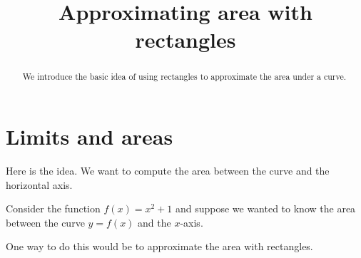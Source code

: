 \documentclass{ximera}
\title[Dig-In:]{Approximating area with rectangles}
\begin{document}
\begin{abstract}
  We introduce the basic idea of using rectangles to approximate the
  area under a curve.
\end{abstract}
\maketitle

\section{Limits and areas}

Here is the idea. We want to compute the area between the curve and
the horizontal axis.

Consider the function $f(x) = x^2 +1$ and suppose we wanted to know
the area between the curve $y=f(x)$ and the $x$-axis.
\begin{image}
\end{image}
One way to do this would be to approximate the area with rectangles.
\end{document}
